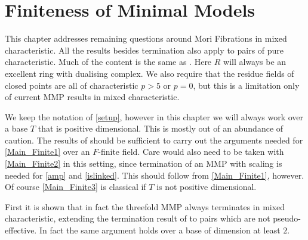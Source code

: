 %
%
%
%
%
%

\chapter{Finiteness of Minimal Models}
	
	This chapter addresses remaining questions around Mori Fibrations in mixed characteristic. All the results besides termination also apply to pairs of pure characteristic. Much of the content is the same as \cite{stigant2021mori}. Here $R$ will always be an excellent ring with dualising complex. We also require that the residue fields of closed points are all of characteristic $p>5$ or $p=0$, but this is a limitation only of current MMP results in mixed characteristic.
	
	We keep the notation of \autoref{setup}, however in this chapter we will always work over a base $T$ that is positive dimensional. This is mostly out of an abundance of caution. The results of \cite{DW19} should be sufficient to carry out the arguments needed for \autoref{Main_Finite1} over an $F$-finite field. Care would also need to be taken with \autoref{Main_Finite2} in this setting, since termination of an MMP with scaling is needed for \autoref{amp} and \autoref{islinked}. This should follow from \autoref{Main_Finite1}, however. Of course \autoref{Main_Finite3} is classical if $T$ is not positive dimensional.
	
	First it is shown that in fact the threefold MMP always terminates in mixed characteristic, extending the termination result of \cite{bhatt2020} to pairs which are not pseudo-effective. In fact the same argument holds over a base of dimension at least $2$.
	
